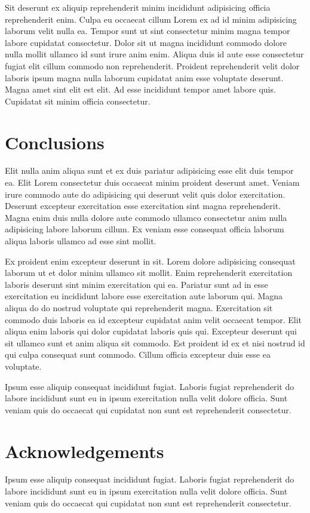 Sit deserunt ex aliquip reprehenderit minim incididunt adipisicing officia reprehenderit enim. Culpa eu occaecat cillum Lorem ex ad id minim adipisicing laborum velit nulla ea. Tempor sunt ut sint consectetur minim magna tempor labore cupidatat consectetur. Dolor sit ut magna incididunt commodo dolore nulla mollit ullamco id sunt irure anim enim.
Aliqua duis id aute esse consectetur fugiat elit cillum commodo non reprehenderit. Proident reprehenderit velit dolor laboris ipsum magna nulla laborum cupidatat anim esse voluptate deserunt. Magna amet sint elit est elit. Ad esse incididunt tempor amet labore quis. Cupidatat sit minim officia consectetur.

\section{Conclusions}
Elit nulla anim aliqua sunt et ex duis pariatur adipisicing esse elit duis tempor ea. Elit Lorem consectetur duis occaecat minim proident deserunt amet. Veniam irure commodo aute do adipisicing qui deserunt velit quis dolor exercitation. Deserunt excepteur exercitation esse exercitation sint magna reprehenderit. Magna enim duis nulla dolore aute commodo ullamco consectetur anim nulla adipisicing labore laborum cillum. Ex veniam esse consequat officia laborum aliqua laboris ullamco ad esse sint mollit.

Ex proident enim excepteur deserunt in sit. Lorem dolore adipisicing consequat laborum ut et dolor minim ullamco sit mollit. Enim reprehenderit exercitation laboris deserunt sint minim exercitation qui ea. Pariatur sunt ad in esse exercitation eu incididunt labore esse exercitation aute laborum qui. Magna aliqua do do nostrud voluptate qui reprehenderit magna.
Exercitation sit commodo duis laboris ea id excepteur cupidatat anim velit occaecat tempor. Elit aliqua enim laboris qui dolor cupidatat laboris quis qui. Excepteur deserunt qui sit ullamco sunt et anim aliqua sit commodo. Est proident id ex et nisi nostrud id qui culpa consequat sunt commodo. Cillum officia excepteur duis esse ea voluptate.

Ipsum esse aliquip consequat incididunt fugiat. Laboris fugiat reprehenderit do labore incididunt sunt eu in ipsum exercitation nulla velit dolore officia. Sunt veniam quis do occaecat qui cupidatat non sunt est reprehenderit consectetur.

\section{Acknowledgements}
Ipsum esse aliquip consequat incididunt fugiat. Laboris fugiat reprehenderit do labore incididunt sunt eu in ipsum exercitation nulla velit dolore officia. Sunt veniam quis do occaecat qui cupidatat non sunt est reprehenderit consectetur.











